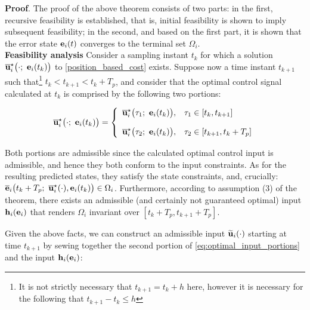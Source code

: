 \textbf{Proof}. The proof of the above theorem consists of two parts:
in the first, recursive feasibility is established, that is, initial
feasibility is shown to imply subsequent feasibility; in the second, and based
on the first part, it is shown that the error state $\bm{\mathbf{e}}_i(t)$ converges
to the terminal set $\Omega_i$.\\[2.5ex]

\textbf{Feasibility analysis}
Consider a sampling instant $t_k$ for which a
solution $\overline{\vect{u}}_i^{\star}\big(\cdot;\ \vect{e}_i(t_k)\big)$ to
\eqref{position_based_cost} exists.
Suppose now a time instant $t_{k+1}$ such that\footnote{It is not strictly necessary
that $t_{k+1} = t_k + h$ here, however it is necessary for the following that
$t_{k+1} - t_k \leq h$} $t_k < t_{k+1} < t_k + T_p$, and consider that the
optimal control signal calculated at $t_k$ is comprised by the following two
portions:

\begin{equation}
  \overline{\vect{u}}_i^{\star}\big(\cdot;\ \vect{e}_i(t_k)\big) = \left\{
      \begin{array}{ll}
        \overline{\vect{u}}_i^{\star}\big(\tau_1;\ \vect{e}_i(t_k)\big), & \tau_1 \in [t_k, t_{k+1}] \\[2.5ex]
        \overline{\vect{u}}_i^{\star}\big(\tau_2;\ \vect{e}_i(t_k)\big), & \tau_2 \in [t_{k+1}, t_k + T_p]
      \end{array}
      \right.
  \label{eq:optimal_input_portions}
\end{equation}

Both portions are admissible since the calculated optimal control input is
admissible, and hence they both conform to the input constraints.
As for the resulting predicted states, they satisfy the state constraints, and,
crucially: $\overline{\vect{e}}_i\big(t_k + T_p;\ \overline{\vect{u}}_i^{\star}(\cdot), \vect{e}_i(t_k)\big) \in \Omega_i$.
Furthermore, according to assumption (3) of the theorem, there exists an
admissible (and certainly not guaranteed optimal) input $\bm{\mathbf{h}}_i(\bm{\mathbf{e}}_i)$ that
renders $\Omega_i$ invariant over $[t_k + T_p, t_{k+1} + T_p]$.

Given the above facts, we can construct an admissible input
$\widetilde{\bm{\mathbf{u}}}_i(\cdot)$  starting at time $t_{k+1}$ by sewing together
the second portion of \eqref{eq:optimal_input_portions} and the input
$\bm{\mathbf{h}}_i(\bm{\mathbf{e}}_i)$:

